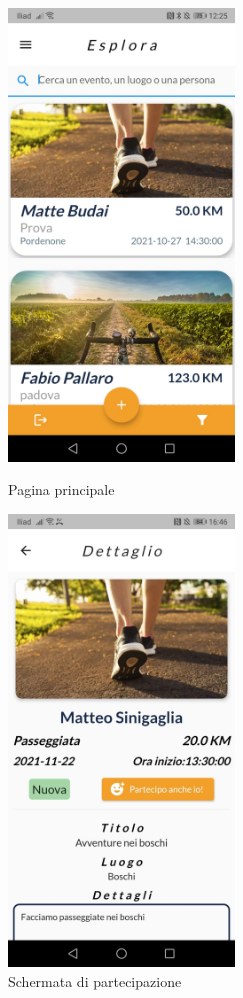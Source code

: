 \begin{figure}[htbp]
	\begin{minipage}[b]{0.47\textwidth}
		\centering
		\includegraphics[width=6cm]{immagini/colori.jpeg}
		\caption{Pagina principale}
		\label{fig:Pagina principale}
	\end{minipage}
	\hfill
	\begin{minipage}[b]{0.47\textwidth}
		\centering
		\includegraphics[width=6cm]{immagini/partecipo.jpeg}
		\caption{Schermata di partecipazione}
		\label{fig:Schermata di partecipazione}
	\end{minipage}
\end{figure}
 

